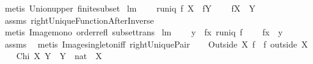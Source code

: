 \begin{isabellebody}
\ {\isacharparenleft}metis\ Union{\isacharunderscore}upper\ finite{\isacharunderscore}subset{\isacharparenright}%
\endisatagproof
{\isafoldproof}%
%
\isadelimproof
\isanewline
%
\endisadelimproof
\isanewline
{}\isamarkupfalse%
\ lm{}{}{}{\isacharcolon}\ \isanewline
\ \ \ {\isachardoublequoteopen}runiq\ f{\isachardoublequoteclose}\ {\isachardoublequoteopen}X\ {\isasymsubseteq}\ {\isacharparenleft}f{\isacharcircum}{\isacharminus}{}{\isacharparenright}{\isacharbackquote}{\isacharbackquote}Y{\isachardoublequoteclose}\ \isanewline
\ \ \ {\isachardoublequoteopen}f{\isacharbackquote}{\isacharbackquote}X\ {\isasymsubseteq}\ Y{\isachardoublequoteclose}\ \isanewline
%
\isadelimproof
\ \ %
\endisadelimproof
%
\isatagproof
{}\isamarkupfalse%
\ assms\ rightUniqueFunctionAfterInverse\ \isamarkupfalse%
\ {\isacharparenleft}metis\ Image{\isacharunderscore}mono\ order{\isacharunderscore}refl\ subset{\isacharunderscore}trans{\isacharparenright}%
\endisatagproof
{\isafoldproof}%
%
\isadelimproof
\isanewline
%
\endisadelimproof
\isanewline
{}\isamarkupfalse%
\ lm{}{}{}{\isacharcolon}\ \isanewline
\ \ \ {\isachardoublequoteopen}y\ {\isasymin}\ f{\isacharbackquote}{\isacharbackquote}{\isacharbraceleft}x{\isacharbraceright}{\isachardoublequoteclose}\ {\isachardoublequoteopen}runiq\ f{\isachardoublequoteclose}\ \isanewline
\ \ \ {\isachardoublequoteopen}f{\isacharcomma}{\isacharcomma}x\ {\isacharequal}\ y{\isachardoublequoteclose}\ \isanewline
%
\isadelimproof
\ \ %
\endisadelimproof
%
\isatagproof
{}\isamarkupfalse%
\ assms\ \isamarkupfalse%
\ {\isacharparenleft}metis\ Image{\isacharunderscore}singleton{\isacharunderscore}iff\ rightUniquePair{\isacharparenright}%
\endisatagproof
{\isafoldproof}%
%
\isadelimproof
%
\endisadelimproof
%
\isamarkuptrue%
\isamarkupfalse%
\ \isanewline
\ \ {\isachardoublequoteopen}Outside{\isacharprime}\ X\ f\ {\isacharequal}{\isacharequal}\ f\ outside\ X{\isachardoublequoteclose}\isanewline
\isanewline
{}\isamarkupfalse%
\ \isanewline
\ \ {\isachardoublequoteopen}Chi\ X\ Y\ {\isacharequal}{\isacharequal}\ {\isacharparenleft}Y\ {\isasymtimes}\ {\isacharbraceleft}{}{\isacharcolon}{\isacharcolon}nat{\isacharbraceright}{\isacharparenright}\ {\isacharplus}{\isacharasterisk}\ {\isacharparenleft}X\ {\isasymtimes}\ {\isacharbraceleft}{}{\isacharbraceright}{\isacharparenright}{\isachardoublequoteclose}\isanewline

\end{isabellebody}
